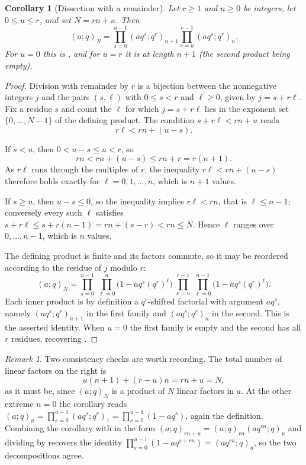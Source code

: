 \documentclass[11pt,a4paper,oneside,openany]{book}
\newtheorem{corollary}[corollary]{Corollary}
\theoremstyle{definition}
\theoremstyle{remark}
\newtheorem{remark}[remark]{Remark}
\begin{document}
\begin{corollary}[Dissection with a remainder]\label{cor:dissection-remainder}
Let $r\ge1$ and $n\ge0$ be integers, let $0\le u\le r$, and set $N=rn+u$.  Then
\[
 (a;q)_N
 =\prod_{s=0}^{u-1}(aq^s;q^r)_{n+1}
  \prod_{s=u}^{r-1}(aq^s;q^r)_n .
\]
For $u=0$ this is , and for $u=r$ it is  at length $n+1$ (the second product being empty).
\end{corollary}

\begin{proof}
Division with remainder by $r$ is a bijection between the nonnegative integers $j$ and the pairs $(s,\ell)$ with $0\le s<r$ and $\ell\ge0$, given by $j=s+r\ell$.  Fix a residue $s$ and count the $\ell$ for which $j=s+r\ell$ lies in the exponent set $\{0,\ldots,N-1\}$ of the defining product.  The condition $s+r\ell<rn+u$ reads
\[
 r\ell<rn+(u-s).
\]

If $s<u$, then $0<u-s\le u<r$, so
\[
 rn<rn+(u-s)\le rn+r=r(n+1).
\]
As $r\ell$ runs through the multiples of $r$, the inequality $r\ell<rn+(u-s)$ therefore holds exactly for $\ell=0,1,\ldots,n$, which is $n+1$ values.

If $s\ge u$, then $u-s\le0$, so the inequality implies $r\ell<rn$, that is $\ell\le n-1$; conversely every such $\ell$ satisfies $s+r\ell\le s+r(n-1)=rn+(s-r)<rn\le N$.  Hence $\ell$ ranges over $0,\ldots,n-1$, which is $n$ values.

The defining product is finite and its factors commute, so it may be reordered according to the residue of $j$ modulo $r$:
\[
 (a;q)_N
 =\prod_{s=0}^{u-1}\ \prod_{\ell=0}^{n}\bigl(1-aq^{s}(q^{r})^{\ell}\bigr)\;
  \prod_{s=u}^{r-1}\ \prod_{\ell=0}^{n-1}\bigl(1-aq^{s}(q^{r})^{\ell}\bigr).
\]
Each inner product is by definition a $q^r$-shifted factorial with argument $aq^s$, namely $(aq^s;q^r)_{n+1}$ in the first family and $(aq^s;q^r)_n$ in the second.  This is the asserted identity.  When $u=0$ the first family is empty and the second has all $r$ residues, recovering .
\end{proof}

\begin{remark}\label{rem:dissection-remainder-checks}
Two consistency checks are worth recording.  The total number of linear factors on the right is
\[
 u(n+1)+(r-u)n=rn+u=N,
\]
as it must be, since $(a;q)_N$ is a product of $N$ linear factors in $a$.  At the other extreme $n=0$ the corollary reads $(a;q)_u=\prod_{s=0}^{u-1}(aq^s;q^r)_1=\prod_{s=0}^{u-1}(1-aq^s)$, again the definition.  Combining the corollary with  in the form $(a;q)_{rn+u}=(a;q)_{rn}(aq^{rn};q)_u$ and dividing by  recovers the identity $\prod_{s=0}^{u-1}(1-aq^{s+rn})=(aq^{rn};q)_u$, so the two decompositions agree.
\end{remark}
\end{document}
